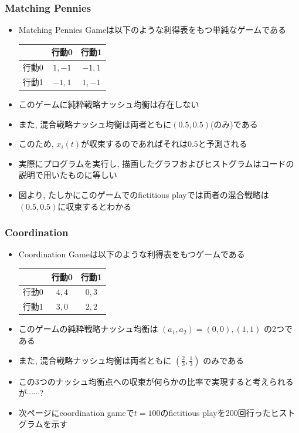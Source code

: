 \documentclass[dvipdfmx,fleqn,handout]{beamer}
\begin{document}
\begin{frame}
\frametitle{Matching Pennies}
\begin{itemize}\setlength{\parskip}{0.5em}

\item
Matching Pennies Gameは以下のような利得表をもつ単純なゲームである
 \begin{table}
 \begin{tabular}{|c|c|c|} \hline
    　 & 行動0 & 行動1 \\ \hline 
    行動0 & $1,-1$ & $-1,1$ \\ \hline
    行動1 & $-1,1$ & $1,-1$ \\ \hline
   \end{tabular}
  \end{table}\pause
\item
このゲームに純粋戦略ナッシュ均衡は存在しない\pause
\item
また, 混合戦略ナッシュ均衡は両者ともに$(0.5,0.5)$(のみ)である \pause
\item
このため, $x_i(t)$が収束するのであればそれは$0.5$と予測される\pause
\item
実際にプログラムを実行し, 描画したグラフおよびヒストグラムはコードの説明で用いたものに等しい
\item
図より, たしかにこのゲームでのfictitious playでは両者の混合戦略は$(0.5,0.5)$に収束するとわかる

\end{itemize}
\end{frame}

\begin{frame}
\frametitle{Coordination}
\begin{itemize}\setlength{\parskip}{0.5em}
\item
Coordination Gameは以下のような利得表をもつゲームである
 \begin{table}
 \begin{tabular}{|c|c|c|} \hline
    & 行動0 & 行動1 \\ \hline 
    行動0 & $4,4$ & $0,3$ \\ \hline
    行動1 & $3,0$ & $2,2$ \\ \hline
   \end{tabular}
  \end{table}\pause
\item
このゲームの純粋戦略ナッシュ均衡は
$(a_1,a_2)=(0,0),(1,1)$
の2つである\pause
\item
また, 混合戦略ナッシュ均衡は両者ともに
$(\frac{2}{3},\frac{1}{3})$
のみである
\pause
\item
この3つのナッシュ均衡点への収束が何らかの比率で実現すると考えられるが$\cdots\cdots$?
\item
次ページにcoordination gameで$t=100$のfictitious playを200回行ったヒストグラムを示す
\end{itemize}
\end{frame}
\end{document}
